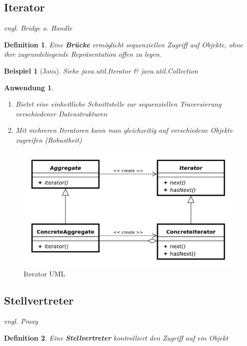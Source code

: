 \documentclass[a4paper]{article}
\theoremstyle{break}
\newtheorem{defi}{Definition}[section]
\newtheorem{ex}{Beispiel}[section]
\newtheorem{why}{Anwendung}[section]
\begin{document}
\subsection{Iterator}
\textit{engl. Bridge o. Handle}
\begin{defi}
	Eine \textbf{Brücke} ermöglicht sequenziellen Zugriff auf Objekte, ohne ihre zugrundeliegende Repräsentation offen zu legen.
\end{defi}
\begin{ex}[Java]
	Siehe java.util.Iterator \& java.util.Collection
\end{ex}
\begin{why}
	\begin{enumerate}
		\item Bietet eine einheitliche Schnittstelle zur sequenziellen Traversierung verschiedener Datenstrukturen
		\item Mit mehreren Iteratoren kann man gleichzeitig auf verschiedene Objekte zugreifen (Robustheit)
	\end{enumerate}
\end{why}
\begin{figure}[H]
	\centering
	\includegraphics[width=\textwidth]{../diagrams/uml/IteratorPattern.png}
	\caption{Iterator UML}
\end{figure}

\newpage
\subsection{Stellvertreter}
\textit{engl. Proxy}
\begin{defi}
	Eine \textbf{Stellvertreter} kontrolliert den Zugriff auf ein Objekt
\end{defi}
\end{document}
